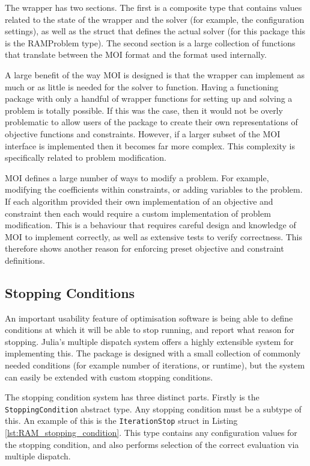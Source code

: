 The wrapper has two sections. The first is a composite type that contains values related to the state of the wrapper and the solver (for example, the configuration settings), as well as the struct that defines the actual solver (for this package this is the RAMProblem type). The second section is a large collection of functions that translate between the MOI format and the format used internally. 

A large benefit of the way MOI is designed is that the wrapper can implement as much or as little is needed for the solver to function. Having a functioning package with only a handful of wrapper functions for setting up and solving a problem is totally possible. If this was the case, then it would not be overly problematic to allow users of the package to create their own representations of objective functions and constraints. However, if a larger subset of the MOI interface is implemented then it becomes far more complex. This complexity is specifically related to problem modification. 

MOI defines a large number of ways to modify a problem. For example, modifying the coefficients within constraints, or adding variables to the problem. If each algorithm provided their own implementation of an objective and constraint then each would require a custom implementation of problem modification. This is a behaviour that requires careful design and knowledge of MOI to implement correctly, as well as extensive tests to verify correctness. This therefore shows another reason for enforcing preset objective and constraint definitions.


\subsection{Stopping Conditions}\label{sub:RAM_stopping_cond}
An important usability feature of optimisation software is being able to define conditions at which it will be able to stop running, and report what reason for stopping. Julia's multiple dispatch system offers a highly extensible system for implementing this. The package is designed with a small collection of commonly needed conditions (for example number of iterations, or runtime), but the system can easily be extended with custom stopping conditions.

The stopping condition system has three distinct parts. Firstly is the \texttt{StoppingCondition} abstract type. Any stopping condition must be a subtype of this. An example of this is the \texttt{IterationStop} struct in Listing \ref{lst:RAM_stopping_condition}. This type contains any configuration values for the stopping condition, and also performs selection of the correct evaluation via multiple dispatch.

